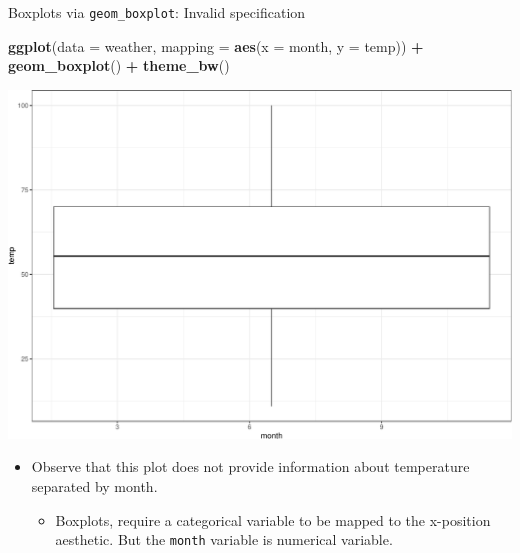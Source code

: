 \documentclass[
  ignorenonframetext,
]{beamer}
\newenvironment{Shaded}{\begin{snugshade}}{\end{snugshade}}
\newcommand{\AttributeTok}[1]{\textcolor[rgb]{0.13,0.29,0.53}{#1}}
\newcommand{\FunctionTok}[1]{\textcolor[rgb]{0.13,0.29,0.53}{\textbf{#1}}}
\newcommand{\NormalTok}[1]{#1}
\newcommand{\SpecialCharTok}[1]{\textcolor[rgb]{0.81,0.36,0.00}{\textbf{#1}}}
\providecommand{\tightlist}{%
  \setlength{\itemsep}{0pt}\setlength{\parskip}{0pt}}
\begin{document}
\begin{frame}[fragile]{Boxplots via \texttt{geom\_boxplot}: Invalid
specification}
\protect\hypertarget{boxplots-via-geom_boxplot-invalid-specification}{}
\tiny

\begin{Shaded}
\begin{Highlighting}[]
\FunctionTok{ggplot}\NormalTok{(}\AttributeTok{data =}\NormalTok{ weather, }\AttributeTok{mapping =} \FunctionTok{aes}\NormalTok{(}\AttributeTok{x =}\NormalTok{ month, }\AttributeTok{y =}\NormalTok{ temp)) }\SpecialCharTok{+}
  \FunctionTok{geom\_boxplot}\NormalTok{() }\SpecialCharTok{+} 
  \FunctionTok{theme\_bw}\NormalTok{()}
\end{Highlighting}
\end{Shaded}

\begin{center}\includegraphics[width=0.4\linewidth,height=0.5\textheight]{Week2_Lect_files/figure-beamer/unnamed-chunk-33-1} \end{center}
\normalsize

\begin{itemize}
\item
  Observe that this plot does not provide information about temperature
  separated by month.

  \begin{itemize}
  \tightlist
  \item
    Boxplots, require a categorical variable to be mapped to the
    x-position aesthetic. But the \texttt{month} variable is numerical
    variable.
  \end{itemize}
\end{itemize}
\end{frame}
\end{document}
